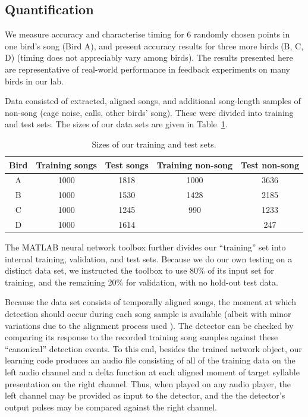\documentclass[10pt,letterpaper]{article}
\begin{document}
\subsection{Quantification}
\label{sec:quantify}

We measure accuracy and characterise timing for 6 randomly chosen
points in one bird's song (Bird A), and present accuracy results for
three more birds (B, C, D) (timing does not appreciably vary among
birds). The results presented here are representative of real-world
performance in feedback experiments on many birds in our lab.


Data consisted of extracted, aligned songs, and additional song-length samples of non-song (cage noise, calls, other birds' song). These were divided into training and test sets. The sizes of our data sets are given in Table~\ref{table:datasizes}.

\begin{table}
  \begin{tabular}{c|cccc}
    Bird & Training songs & Test songs & Training non-song & Test non-song \\ \hline
    A & 1000 & 1818 & 1000 & 3636 \\
    B & 1000 & 1530 & 1428 & 2185 \\
    C & 1000 & 1245 & 990 & 1233 \\
    D & 1000 & 1614 &  & 247
  \end{tabular}
  \caption{Sizes of our training and test sets.}
  \label{table:datasizes}
\end{table}

The MATLAB neural network toolbox further divides our ``training'' set
into internal training, validation, and test sets.  Because we do our
own testing on a distinct data set, we instructed the
toolbox to use 80\% of its input set for training, and the
remaining 20\% for validation, with no hold-out test data.

Because the data set consists of temporally aligned songs, the moment
at which detection should occur during each song sample is available
(albeit with minor variations due to the alignment process used
\cite{Poole2012}).  The detector can be checked by comparing its
response to the recorded training song samples against these
``canonical'' detection events.  To this end, besides the trained
network object, our learning code produces an audio file consisting of
all of the training data on the left audio channel and a delta
function at each aligned moment of target syllable presentation on the
right channel. Thus, when played on any audio player, the left channel
may be provided as input to the detector, and the the detector's
output pulses may be compared against the right channel.
\end{document}
